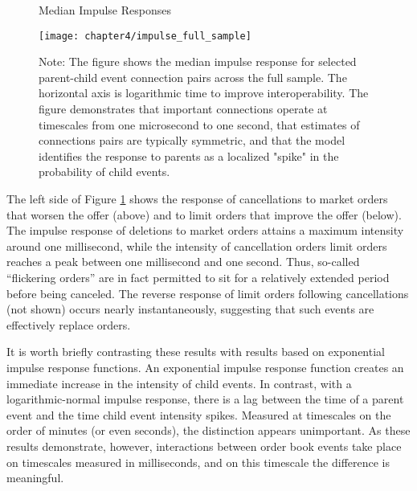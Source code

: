 		\begin{figure}[p]
			\small
			\linespread{1}
			\centering
			\captionsetup{labelsep=colon, font=footnotesize, justification=centerfirst, width=\linewidth}
			\caption{Median Impulse Responses}
			\label{fig:impulse_full_sample}
			\texttt{[image: chapter4/impulse\_full\_sample]}
			\captionsetup{position=below, font=footnotesize, justification=justified, width=\linewidth}
			\caption*{Note: The figure shows the median impulse response for selected parent-child event connection pairs across the full sample. The horizontal axis is logarithmic time to improve interoperability. The figure demonstrates that important connections operate at timescales from one microsecond to one second, that estimates of connections pairs are typically symmetric, and that the model identifies the response to parents as a localized "spike" in the probability of child events.}
		\end{figure}

		The left side of Figure \ref{fig:impulse_full_sample} shows the response of cancellations to market orders that worsen the offer (above) and to limit orders that improve the offer (below). The impulse response of deletions to market orders attains a maximum intensity around one millisecond, while the intensity of cancellation orders limit orders reaches a peak between one millisecond and one second. Thus, so-called ``flickering orders'' are in fact permitted to sit for a relatively extended period before being canceled. The reverse response of limit orders following cancellations (not shown) occurs nearly instantaneously, suggesting that such events are effectively replace orders.

		It is worth briefly contrasting these results with results based on exponential impulse response functions. An exponential impulse response function creates an immediate increase in the intensity of child events. In contrast, with a logarithmic-normal impulse response, there is a lag between the time of a parent event and the time child event intensity spikes. Measured at timescales on the order of minutes (or even seconds), the distinction appears unimportant. As these results demonstrate, however, interactions between order book events take place on timescales measured in milliseconds, and on this timescale the difference is meaningful.

